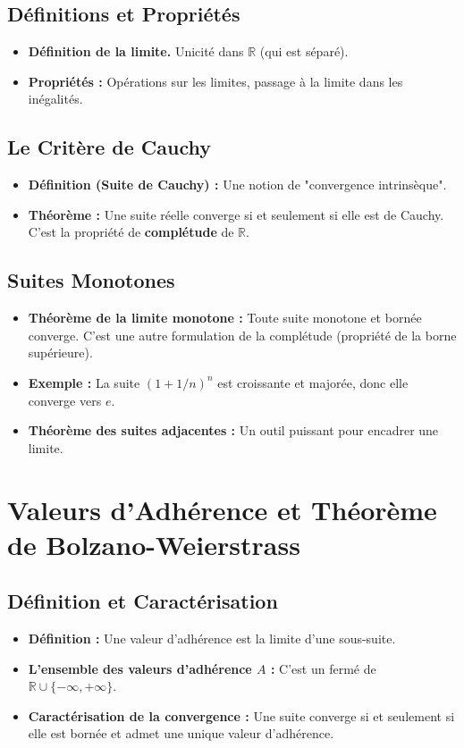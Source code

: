 \documentclass[12pt, a4paper, parskip=full]{report}
\theoremstyle{agregstyle}
\begin{document}
\subsection{Définitions et Propriétés}
\begin{itemize}
    \item \textbf{Définition de la limite.} Unicité dans $\mathbb{R}$ (qui est séparé).
    \item \textbf{Propriétés :} Opérations sur les limites, passage à la limite dans les inégalités.
\end{itemize}
\subsection{Le Critère de Cauchy}
\begin{itemize}
    \item \textbf{Définition (Suite de Cauchy) :} Une notion de "convergence intrinsèque".
    \item \textbf{Théorème :} Une suite réelle converge si et seulement si elle est de Cauchy. C'est la propriété de \textbf{complétude} de $\mathbb{R}$.
\end{itemize}
\subsection{Suites Monotones}
\begin{itemize}
    \item \textbf{Théorème de la limite monotone :} Toute suite monotone et bornée converge. C'est une autre formulation de la complétude (propriété de la borne supérieure).
    \item \textbf{Exemple :} La suite $(1+1/n)^n$ est croissante et majorée, donc elle converge vers $e$.
    \item \textbf{Théorème des suites adjacentes :} Un outil puissant pour encadrer une limite.
\end{itemize}

\section{Valeurs d'Adhérence et Théorème de Bolzano-Weierstrass}
\subsection{Définition et Caractérisation}
\begin{itemize}
    \item \textbf{Définition :} Une valeur d'adhérence est la limite d'une sous-suite.
    \item \textbf{L'ensemble des valeurs d'adhérence $A$ :} C'est un fermé de $\mathbb{R} \cup \{-\infty, +\infty\}$.
    \item \textbf{Caractérisation de la convergence :} Une suite converge si et seulement si elle est bornée et admet une unique valeur d'adhérence.
\end{itemize}
\end{document}
